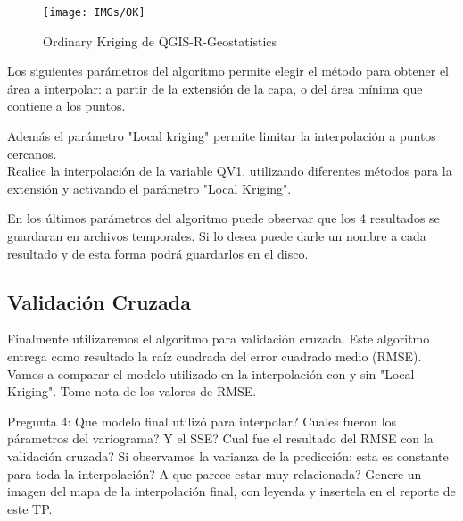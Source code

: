 \documentclass[onecolumn]{article}
\begin{document}
\begin{figure}[h]
	\centering
	\texttt{[image: IMGs/OK]}
	\caption{Ordinary Kriging de QGIS-R-Geostatistics}
\end{figure}

Los siguientes parámetros del algoritmo permite elegir el método para obtener el área a interpolar: a partir de la extensión de la capa, o del área mínima que contiene a los puntos.

Además el parámetro "Local kriging" permite limitar la interpolación a puntos cercanos. \\

Realice la interpolación de la variable QV1, utilizando diferentes métodos para la extensión y activando el parámetro "Local Kriging".

En los últimos parámetros del algoritmo puede observar que los 4 resultados se guardaran en archivos temporales. Si lo desea puede darle un nombre a cada resultado y de esta forma podrá guardarlos en el disco.

\subsection{Validación Cruzada}

Finalmente utilizaremos el algoritmo para validación cruzada. Este algoritmo entrega como resultado la raíz cuadrada del error cuadrado medio (RMSE). Vamos a comparar el modelo utilizado en la interpolación con y sin "Local Kriging". Tome nota de los valores de RMSE.

\begin{mdframed}[]
	Pregunta 4: Que modelo final utilizó para interpolar? Cuales fueron los párametros del variograma? Y el SSE? Cual fue el resultado del RMSE con la validación cruzada?
	Si observamos la varianza de la predicción: esta es constante para toda la interpolación? A que parece estar muy relacionada?
	Genere un imagen del mapa de la interpolación final, con leyenda y insertela en el reporte de este TP.
\end{mdframed}
\end{document}
